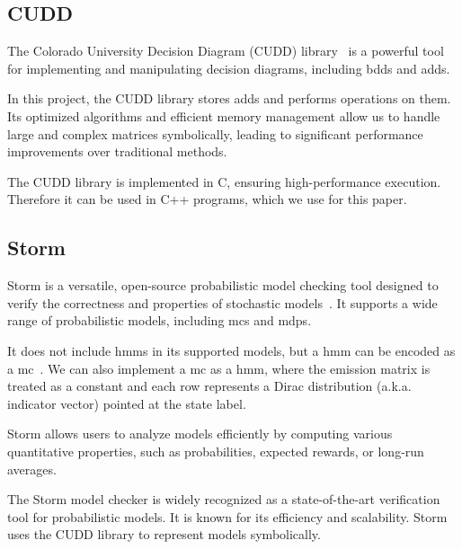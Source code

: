 \subsection{CUDD}\label{subsec:cudd}
The Colorado University Decision Diagram (CUDD) library~\cite{somenzi1997cudd} is a powerful tool for implementing and manipulating decision diagrams, including \glspl{bdd} and \glspl{add}. 

In this project, the CUDD library stores \glspl{add} and performs operations on them.
Its optimized algorithms and efficient memory management allow us to handle large and complex matrices symbolically, leading to significant performance improvements over traditional methods.

The CUDD library is implemented in C, ensuring high-performance execution. 
Therefore it can be used in C++ programs, which we use for this paper.

\subsection{Storm}\label{subsec:storm}
Storm is a versatile, open-source probabilistic model checking tool designed to verify the correctness and properties of stochastic models~\cite{hensel2021probabilistic}. 
It supports a wide range of probabilistic models, including \glspl{mc} and \glspl{mdp}.

It does not include \glspl{hmm} in its supported models, but a \gls{hmm} can be encoded as a \gls{mc}~\cite{rabiner1989tutorial}.
We can also implement a \gls{mc} as a \gls{hmm}, where the emission matrix is treated as a constant and each row represents a Dirac distribution (a.k.a. indicator vector) pointed at the state label. 

Storm allows users to analyze models efficiently by computing various quantitative properties, such as probabilities, expected rewards, or long-run averages.

The Storm model checker is widely recognized as a state-of-the-art verification tool for probabilistic models. It is known for its efficiency and scalability.
Storm uses the CUDD library to represent models symbolically.



